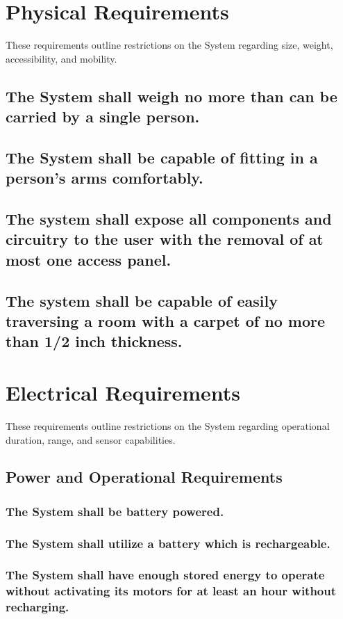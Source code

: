 \documentclass[12pt]{article}
\begin{document}
\section{Physical Requirements}
These requirements outline restrictions on the System regarding size, weight, accessibility, and mobility.
\subsection{The System shall weigh no more than can be carried by a single person.}
\subsection{The System shall be capable of fitting in a person's arms comfortably.}
\subsection{The system shall expose all components and circuitry to the user with the removal of at most one access panel.}
\subsection{The system shall be capable of easily traversing a room with a carpet of no more than 1/2 inch thickness.}

\section{Electrical Requirements}
These requirements outline restrictions on the System regarding operational duration, range, and sensor capabilities.

\subsection{Power and Operational Requirements}
\subsubsection{The System shall be battery powered.}
\subsubsection{The System shall utilize a battery which is rechargeable.}
\subsubsection{The System shall have enough stored energy to operate without activating its motors for at least an hour without recharging.}
\end{document}

